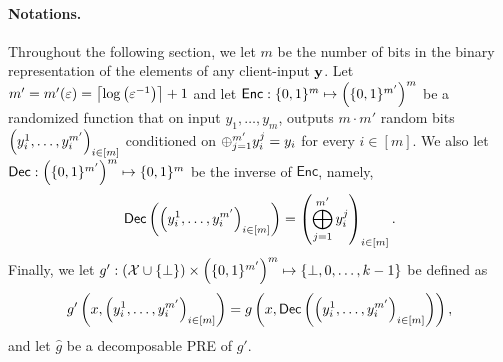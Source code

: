 \documentclass{llncs}
\newcommand{\X}{\mathcal{X}}
\newcommand{\y}{\myvec{y}}
\newcommand{\IKOPS}{\operatorname{IKOPS}}
\renewcommand{\Enc}{\mathsf{Enc}}
\renewcommand{\Dec}{\mathsf{Dec}}
\begin{document}
\paragraph{Notations.}
Throughout the following section, we let $m$ be the number of bits in the binary representation of the elements of any client-input $\y$. Let $m'=m'(\varepsilon)=\left\lceil \log\left ( \varepsilon^{-1} \right ) \right\rceil+1$ and let $\Enc:\zo^{m}\mapsto\left(\zo^{m'}\right)^{m}$ be a randomized function that on input $y_1,\ldots,y_m$, outputs $m\cdot m'$ random bits $\left ( y_i^1,\ldots,y_i^{m'} \right )_{i\in[m]}$ conditioned on $\oplus_{j=1}^{m'}y_i^j=y_i$ for every $i\in[m]$. We also let $\Dec:\left(\zo^{m'}\right)^{m}\mapsto\zo^{m}$ be the inverse of $\Enc$, namely, $$\Dec\of{\vect{y_i^1,\ldots,y_i^{m'}}_{i\in[m]}}=\vect{\bigoplus_{j=1}^{m'}y_i^j}_{i\in[m]}.$$
Finally, we let $g':(\X\cup\set{\bot})\times\left(\zo^{m'}\right)^{m}\mapsto\set{\bot,0,\ldots,k-1}$ be defined as
$$g'\of{x,\vect{y_i^1,\ldots,y_i^{m'}}_{i\in[m]}}=g\left(x,\Dec\of{\vect{y_i^1,\ldots,y_i^{m'}}_{i\in[m]}}\right),
$$
and let $\hat{g}$ be a decomposable PRE of $g'$.
\end{document}
